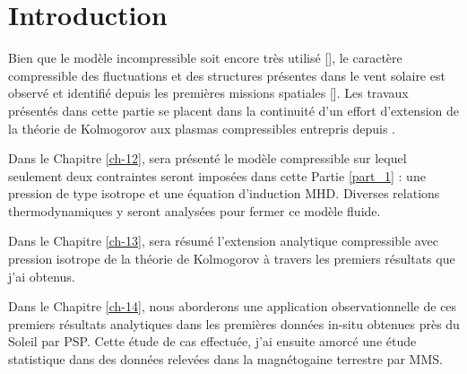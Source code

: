 \chapter*{Introduction}
 \adjustmtc
\renewcommand\partie{\Partie\ INTRO}
\label{ch-10}

Bien que le modèle incompressible soit encore très utilisé [\cite{marino_scaling_2023}], le caractère compressible des fluctuations et des structures présentes dans le vent solaire est observé et identifié depuis les premières missions spatiales [\cite{tu_mhd_1995}]. Les travaux présentés dans cette partie se placent dans la continuité d'un effort d'extension de la théorie de Kolmogorov aux plasmas compressibles entrepris depuis \cite{banerjee_exact_2013}. 

Dans le Chapitre \ref{ch-12}, sera présenté le modèle compressible sur lequel seulement deux contraintes seront imposées dans cette Partie \ref{part_1} : une pression de type isotrope et une équation d'induction \ac{MHD}. Diverses relations thermodynamiques y seront analysées pour fermer ce modèle fluide. 

Dans le Chapitre \ref{ch-13}, sera résumé l'extension analytique compressible avec pression isotrope de la théorie de Kolmogorov à travers les premiers résultats que j'ai obtenus. 

Dans le Chapitre \ref{ch-14}, nous aborderons une application observationnelle de ces premiers résultats analytiques dans les premières données in-situ obtenues près du Soleil par \ac{PSP}. Cette étude de cas effectuée, j'ai ensuite amorcé une étude statistique dans des données relevées dans la magnétogaine terrestre par \ac{MMS}. 

         
